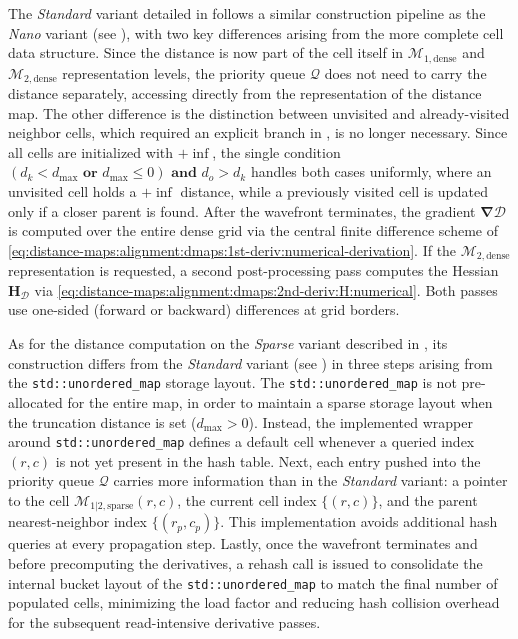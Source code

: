 The \emph{Standard} variant detailed in
 follows a similar construction
pipeline as the \emph{Nano} variant
(see ), with two key
differences arising from the more complete cell data structure.
Since the distance is now part of the cell itself in $\mathcal{M}_{1,\mathrm{dense}}$ and
$\mathcal{M}_{2,\mathrm{dense}}$ representation levels, the priority queue $\mathcal{Q}$
does not need to carry the distance separately, accessing directly from the
representation of the distance map.
The other difference is the distinction between unvisited and already-visited
neighbor cells, which required an explicit branch in
, is no longer necessary.
Since all cells are initialized with $+\inf$, the single condition
$\left(d_k < d_{\max} \textbf{ or } d_{\max} \leq 0\right) \textbf{ and }d_o > d_k$
handles both cases uniformly, where an unvisited cell holds a $+\inf$ distance,
while a previously visited cell is updated only if a closer parent is found.
After the wavefront terminates, the gradient
$\bm{\nabla}\mathcal{D}$ is computed over the entire dense grid via the
central finite difference scheme of
\eqref{eq:distance-maps:alignment:dmaps:1st-deriv:numerical-derivation}.
If the $\mathcal{M}_{2,\mathrm{dense}}$ representation is requested, a second
post-processing pass computes the Hessian $\mathbf{H}_{\mathcal{D}}$
via \eqref{eq:distance-maps:alignment:dmaps:2nd-deriv:H:numerical}.
Both passes use one-sided (forward or backward) differences at grid borders.

As for the distance computation on the \emph{Sparse} variant described in
, its construction differs
from the \emph{Standard} variant
(see ) in three steps arising
from the \texttt{std::unordered\_map} storage layout. The
\texttt{std::unordered\_map} is not pre-allocated for the entire map, in order
to maintain a sparse storage layout when the truncation distance is set
($d_{\max} > 0$). Instead, the implemented wrapper around
\texttt{std::unordered\_map} defines a default cell whenever a queried index
$(r, c)$ is not yet present in the hash table.
Next, each entry pushed into the priority queue $\mathcal{Q}$ carries more
information than in the \emph{Standard} variant: a pointer to the
cell $\mathcal{M}_{1|2,\mathrm{sparse}}(r, c)$, the current cell index
$\{(r, c)\}$, and the parent nearest-neighbor index $\{(r_p, c_p)\}$.
This implementation avoids additional hash queries at every propagation step.
Lastly, once the wavefront terminates and before precomputing the derivatives,
a rehash call is issued to consolidate the internal bucket layout of the
\texttt{std::unordered\_map} to match the final number of populated
cells, minimizing the load factor and reducing hash collision overhead
for the subsequent read-intensive derivative passes.

